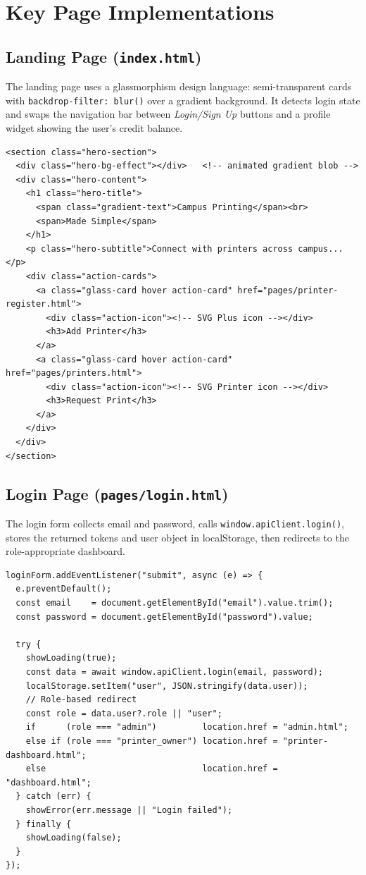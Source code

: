 \documentclass[12pt,a4paper]{report}
\begin{document}
\section{Key Page Implementations}

\subsection{Landing Page (\texttt{index.html})}

The landing page uses a glassmorphism design language: semi-transparent cards with
\texttt{backdrop-filter: blur()} over a gradient background. It detects login state and
swaps the navigation bar between \emph{Login/Sign Up} buttons and a profile widget showing
the user's credit balance.

\begin{lstlisting}[style=jsStyle, caption={Hero section HTML structure}]
<section class="hero-section">
  <div class="hero-bg-effect"></div>   <!-- animated gradient blob -->
  <div class="hero-content">
    <h1 class="hero-title">
      <span class="gradient-text">Campus Printing</span><br>
      <span>Made Simple</span>
    </h1>
    <p class="hero-subtitle">Connect with printers across campus...</p>
    <div class="action-cards">
      <a class="glass-card hover action-card" href="pages/printer-register.html">
        <div class="action-icon"><!-- SVG Plus icon --></div>
        <h3>Add Printer</h3>
      </a>
      <a class="glass-card hover action-card" href="pages/printers.html">
        <div class="action-icon"><!-- SVG Printer icon --></div>
        <h3>Request Print</h3>
      </a>
    </div>
  </div>
</section>
\end{lstlisting}

\subsection{Login Page (\texttt{pages/login.html})}

The login form collects email and password, calls \texttt{window.apiClient.login()}, stores
the returned tokens and user object in localStorage, then redirects to the role-appropriate
dashboard.

\begin{lstlisting}[style=jsStyle, caption={Login form submission handler}]
loginForm.addEventListener("submit", async (e) => {
  e.preventDefault();
  const email    = document.getElementById("email").value.trim();
  const password = document.getElementById("password").value;

  try {
    showLoading(true);
    const data = await window.apiClient.login(email, password);
    localStorage.setItem("user", JSON.stringify(data.user));
    // Role-based redirect
    const role = data.user?.role || "user";
    if      (role === "admin")         location.href = "admin.html";
    else if (role === "printer_owner") location.href = "printer-dashboard.html";
    else                               location.href = "dashboard.html";
  } catch (err) {
    showError(err.message || "Login failed");
  } finally {
    showLoading(false);
  }
});
\end{lstlisting}
\end{document}
